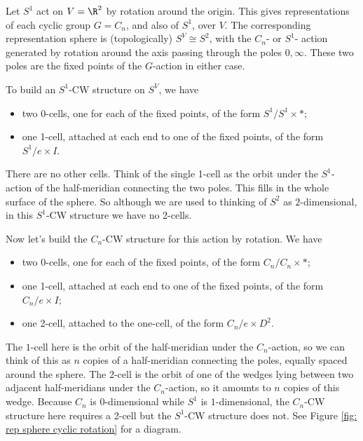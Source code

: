 \begin{example}
  Let $S^1$ act on $V = \R^2$ by rotation around the origin. This gives representations of each cyclic group $G = C_n$, and also of $S^1$, over $V$. The corresponding representation sphere is (topologically) $S^V \cong S^2$, with the $C_n$- or $S^1$- action generated by rotation around the axis passing through the poles $0, \infty$. These two poles are the fixed points of the $G$-action in either case.

  To build an $S^1$-CW structure on $S^V$, we have 
  \begin{itemize}
    \item two 0-cells, one for each of the fixed points, of the form $S^1/S^1 \times *$;
    \item one 1-cell, attached at each end to one of the fixed points, of the form $S^1/e \times I$.
  \end{itemize}
  There are no other cells. Think of the single 1-cell as the orbit under the $S^1$-action of the half-meridian connecting the two poles. This fills in the whole surface of the sphere. So although we are used to thinking of $S^2$ as $2$-dimensional, in this $S^1$-CW structure we have no 2-cells.

  Now let's build the $C_n$-CW structure for this action by rotation. We have 
  \begin{itemize}
    \item two 0-cells, one for each of the fixed points, of the form $C_n/C_n \times *$;
    \item one 1-cell, attached at each end to one of the fixed points, of the form $C_n/e \times I$;
    \item one 2-cell, attached to the one-cell, of the form $C_n/e \times D^2$.
  \end{itemize}
  The $1$-cell here is the orbit of the half-meridian under the $C_n$-action, so we can think of this as $n$ copies of a half-meridian connecting the poles, equally spaced around the sphere. The 2-cell is the orbit of one of the wedges lying between two adjacent half-meridians under the $C_n$-action, so it amounts to $n$ copies of this wedge. Because $C_n$ is $0$-dimensional while $S^1$ is $1$-dimensional, the $C_n$-CW structure here requires a 2-cell but the $S^1$-CW structure does not. See Figure \ref{fig: rep sphere cyclic rotation} for a diagram.
\end{example}

